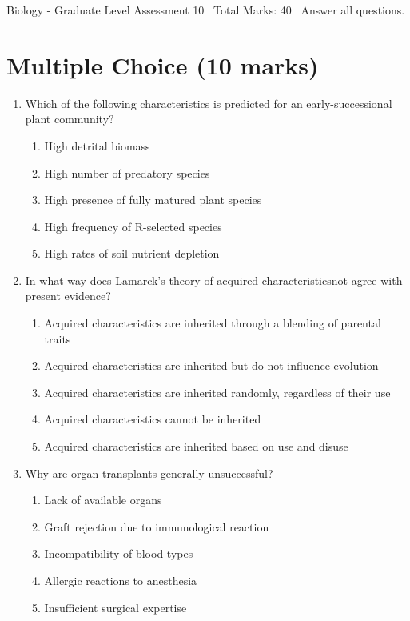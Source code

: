 \documentclass[12pt]{article}
\begin{document}
\begin{center}
Biology - Graduate Level Assessment 10 \
Total Marks: 40 \
Answer all questions.
\end{center}

\section*{Multiple Choice (10 marks)}
\begin{enumerate}[label=\arabic*.]
\item Which of the following characteristics is predicted for an early-successional plant community?
\begin{enumerate}[label=(\alph*)]
    \item High detrital biomass
    \item High number of predatory species
    \item High presence of fully matured plant species
    \item High frequency of R-selected species
    \item High rates of soil nutrient depletion
\end{enumerate}
\item In what way does Lamarck's theory of acquired characteristicsnot agree with present evidence?
\begin{enumerate}[label=(\alph*)]
    \item Acquired characteristics are inherited through a blending of parental traits
    \item Acquired characteristics are inherited but do not influence evolution
    \item Acquired characteristics are inherited randomly, regardless of their use
    \item Acquired characteristics cannot be inherited
    \item Acquired characteristics are inherited based on use and disuse
\end{enumerate}
\item Why are organ transplants generally unsuccessful?
\begin{enumerate}[label=(\alph*)]
    \item Lack of available organs
    \item Graft rejection due to immunological reaction
    \item Incompatibility of blood types
    \item Allergic reactions to anesthesia
    \item Insufficient surgical expertise

\end{enumerate}
\end{enumerate}
\end{document}
